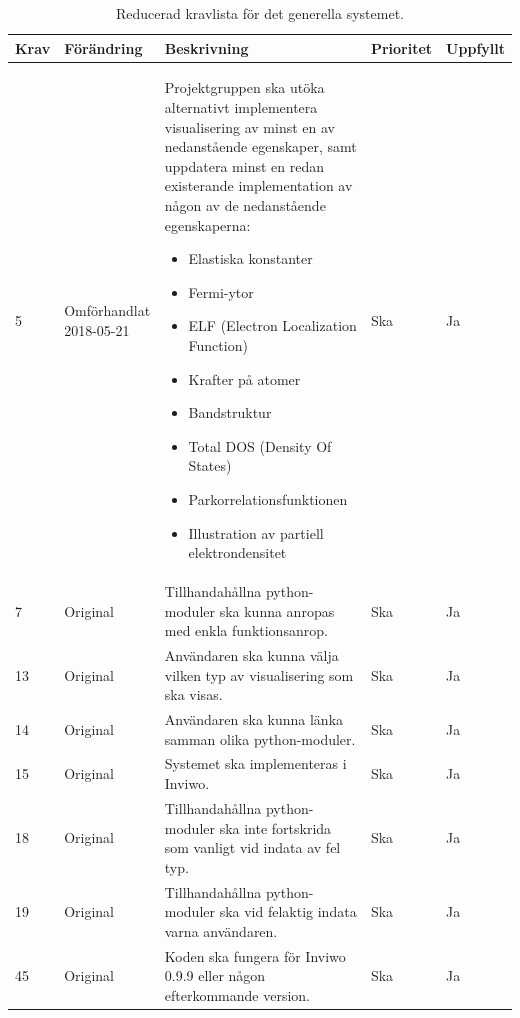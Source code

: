 \documentclass[a4paper,12pt,twoside,openright]{report}
\begin{document}
\begin{table}[H]
\caption{Reducerad kravlista för det generella systemet.}
\begin{center}
\begin{tabular}{ |p{10mm}|p{20mm}|p{70mm}|p{15mm}|p{15mm}|}
\hline
 \textbf{Krav} & \textbf{Förändring} & \textbf{Beskrivning} & \textbf{Prioritet} & \textbf{Uppfyllt}  \\ 
\hline
 5 & Omförhand\-lat 2018-05-21 & Projektgruppen ska utöka alternativt implementera visualisering av minst en av nedanstående  egenskaper, samt uppdatera minst en redan existerande implementation av någon av de nedanstående egenskaperna:
  \begin{itemize}
  \item Elastiska konstanter
  \item Fermi-ytor
  \item ELF (Electron Localization Function)
  \item Krafter på atomer
  \item Bandstruktur
  \item Total DOS (Density Of States)
  \item Parkorrelationsfunktionen
  \item Illustration av partiell elektrondensitet
  \end{itemize} & Ska & Ja \\
\hline
7 & Original & Tillhandahållna python-moduler ska kunna anropas med enkla funktionsanrop. & Ska & Ja \\
\hline
13 & Original & Användaren ska kunna välja vilken typ av visualisering som ska visas. & Ska & Ja \\
\hline
14 & Original & Användaren ska kunna länka samman olika python-moduler. & Ska & Ja \\
\hline
15 & Original & Systemet ska implementeras i Inviwo. & Ska & Ja \\
\hline
18 & Original & Tillhandahållna python-moduler ska inte fortskrida som vanligt vid indata av fel typ. & Ska & Ja \\
\hline
19 & Original & Tillhandahållna python-moduler ska vid felaktig indata varna användaren. & Ska & Ja \\
\hline
45 & Original & Koden ska fungera för Inviwo 0.9.9 eller någon efterkommande version. & Ska & Ja \\
\hline

\end{tabular}
\label{table:kravlista generella systemet}
\end{center}
\end{table}
\end{document}

